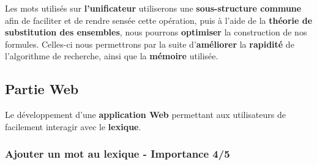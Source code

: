 {Les mots utilisés sur \textbf{l'unificateur} utiliserons une \textbf{sous-structure commune} afin de faciliter et de rendre sensée cette opération, puis à l'aide de la \textbf{théorie de substitution des ensembles}, nous pourrons \textbf{optimiser} la construction de nos formules. Celles-ci nous permettrons par la suite d'\textbf{améliorer} la \textbf{rapidité} de l'algorithme de recherche, ainsi que la \textbf{mémoire} utilisée.\par}


\subsection{Partie Web}
Le développement d'une \textbf{application Web} permettant aux utilisateurs de facilement interagir avec le \textbf{lexique}.

\subsubsection{Ajouter un mot au lexique - Importance 4/5}

